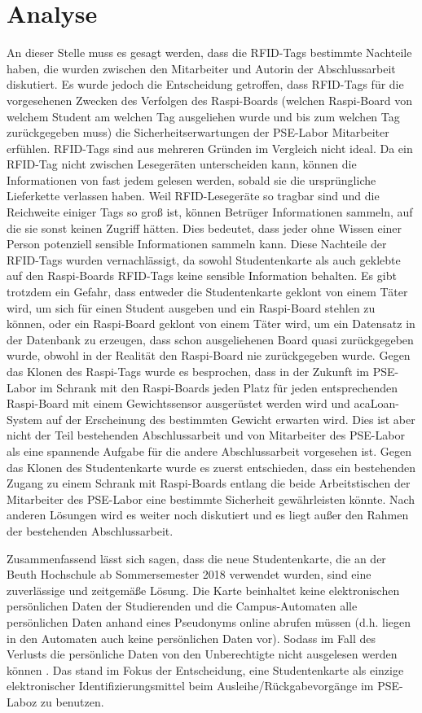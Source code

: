\chapter{Analyse}
\label{sec:analyse}
An dieser Stelle muss es gesagt werden, dass die RFID-Tags bestimmte Nachteile haben, die wurden zwischen den Mitarbeiter und Autorin der Abschlussarbeit diskutiert. Es wurde jedoch die Entscheidung getroffen, dass RFID-Tags für die vorgesehenen Zwecken des Verfolgen des Raspi-Boards (welchen Raspi-Board von welchem Student am welchen Tag ausgeliehen wurde und bis zum welchen Tag zurückgegeben muss) die Sicherheitserwartungen der PSE-Labor Mitarbeiter erfühlen. RFID-Tags sind aus mehreren Gründen im Vergleich nicht ideal. Da ein RFID-Tag nicht zwischen Lesegeräten unterscheiden kann, können die Informationen von fast jedem gelesen werden, sobald sie die ursprüngliche Lieferkette verlassen haben. Weil RFID-Lesegeräte so tragbar sind und die Reichweite einiger Tags so groß ist, können Betrüger Informationen sammeln, auf die sie sonst keinen Zugriff hätten. Dies bedeutet, dass jeder ohne Wissen einer Person potenziell sensible Informationen sammeln kann. Diese Nachteile der RFID-Tags wurden vernachlässigt, da sowohl Studentenkarte als auch geklebte auf den Raspi-Boards RFID-Tags keine sensible Information behalten. Es gibt trotzdem ein Gefahr, dass entweder die Studentenkarte geklont von einem Täter wird, um sich für einen Student ausgeben und ein Raspi-Board stehlen zu können, oder ein Raspi-Board geklont von einem Täter wird, um ein Datensatz in der Datenbank zu erzeugen, dass schon ausgeliehenen Board quasi zurückgegeben wurde, obwohl in der Realität den Raspi-Board nie zurückgegeben wurde. Gegen das Klonen des Raspi-Tags wurde es besprochen, dass in der Zukunft im PSE-Labor im Schrank mit den Raspi-Boards jeden Platz für jeden entsprechenden Raspi-Board mit einem Gewichtssensor ausgerüstet werden wird und acaLoan-System auf der Erscheinung des bestimmten Gewicht erwarten wird. Dies ist aber nicht der Teil bestehenden Abschlussarbeit und von Mitarbeiter des PSE-Labor als eine spannende Aufgabe für die andere Abschlussarbeit vorgesehen ist. Gegen das Klonen des Studentenkarte wurde es zuerst entschieden, dass ein bestehenden Zugang zu einem Schrank mit Raspi-Boards entlang die beide Arbeitstischen der Mitarbeiter des PSE-Labor eine bestimmte Sicherheit gewährleisten könnte. Nach anderen Lösungen wird es weiter noch diskutiert und es liegt außer den Rahmen der bestehenden Abschlussarbeit. 

Zusammenfassend lässt sich sagen, dass die neue Studentenkarte, die an der Beuth Hochschule ab Sommersemester 2018 verwendet wurden, sind eine zuverlässige und zeitgemäße Lösung. Die Karte beinhaltet keine elektronischen persönlichen Daten der Studierenden und die Campus-Automaten alle persönlichen Daten anhand eines Pseudonyms online abrufen müssen (d.h. liegen in den Automaten auch keine persönlichen Daten vor). Sodass im Fall des Verlusts die persönliche Daten von den Unberechtigte nicht ausgelesen werden können \cite{website:12}. Das stand im Fokus der Entscheidung, eine Studentenkarte als einzige elektronischer Identifizierungsmittel beim Ausleihe/Rückgabevorgänge im PSE-Laboz zu benutzen.

